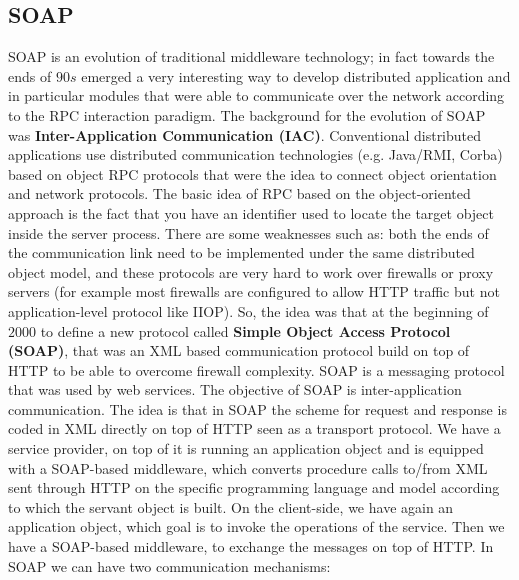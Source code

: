 \subsection{SOAP}
SOAP is an evolution of traditional middleware technology; in fact towards the ends of $90s$ emerged a very interesting way to develop distributed application and in particular modules that were able to communicate over the network according to the RPC interaction paradigm. The background for the evolution of SOAP was \textbf{Inter-Application Communication (IAC)}.
Conventional distributed applications use distributed communication technologies (e.g. Java/RMI, Corba) based on object RPC protocols that were the idea to connect object orientation and network protocols.
The basic idea of RPC based on the object-oriented approach is the fact that you have an identifier used to locate the target object inside the server process.
There are some weaknesses such as: both the ends of the communication link need to be implemented under the same distributed object model, and these protocols are very hard to work over firewalls or proxy servers (for example most firewalls are configured to allow HTTP traffic but not application-level protocol like IIOP).
So, the idea was that at the beginning of $2000$ to define a new protocol called \textbf{Simple Object Access Protocol (SOAP)}, that was an XML based communication protocol build on top of HTTP to be able to overcome firewall complexity.
SOAP is a messaging protocol that was used by web services.
The objective of SOAP is inter-application communication. The idea is that in SOAP the scheme for request and response is coded in XML directly on top of HTTP seen as a transport protocol. We have a service provider, on top of it is running an application object and is equipped with a SOAP-based middleware, which converts procedure calls to/from XML sent through HTTP on the specific programming language and model according to which the servant object is built.
On the client-side, we have again an application object, which goal is to invoke the operations of the service.
Then we have a SOAP-based middleware, to exchange the messages on top of HTTP.
In SOAP we can have two communication mechanisms:
